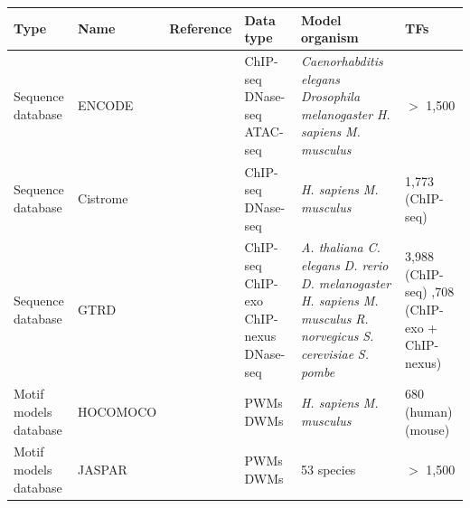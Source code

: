 \documentclass[a4paper, titlepage, openright]{book}
\begin{document}
\begin{longtable}{|p{2cm}|p{2cm}|p{3cm}|p{2cm}|p{4cm}|p{2cm}|}
		\hline
		\textbf{Type}& \textbf{Name}&\textbf{Reference}&\textbf{Data type}& \textbf{Model organism}& \textbf{TFs} \\
		\hline
		Sequence database & ENCODE & \citep{encode2012integrated} & ChIP-seq \newline DNase-seq \newline ATAC-seq & \emph{Caenorhabditis elegans} \newline \emph{Drosophila melanogaster} \newline \emph{H. sapiens} \newline \emph{M. musculus} & $>$ 1,500 \\
		\hline
		Sequence database & Cistrome & \citep{zheng2019cistrome} & ChIP-seq \newline DNase-seq & \emph{H. sapiens} \newline \emph{M. musculus} & 1,773 (ChIP-seq) \\
		\hline
		Sequence database & GTRD & \citep{kolmykov2021gtrd} & ChIP-seq \newline ChIP-exo \newline ChIP-nexus \newline DNase-seq & \emph{A. thaliana} \newline \emph{C. elegans} \newline \emph{D. rerio}  \newline \emph{D. melanogaster} \newline \emph{H. sapiens} \newline \emph{M. musculus} \newline \emph{R. norvegicus} \newline \emph{S. cerevisiae} \newline \emph{S. pombe}  & 3,988 (ChIP-seq) \newline 1,708 (ChIP-exo + ChIP-nexus) \\
		\hline
		Motif models database & HOCOMOCO & \citep{kulakovskiy2013hocomoco, kulakovskiy2018hocomoco} & PWMs \newline DWMs & \emph{H. sapiens} \newline \emph{M. musculus} & 680 (human) \newline 453 (mouse) \\
		\hline
		Motif models database & JASPAR & \citep{sandelin2004jaspar, fornes2020jaspar} & PWMs \newline DWMs & 53 species & $>$ 1,500 \\

\end{longtable}
\end{document}
